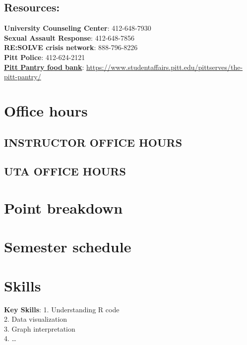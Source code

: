 \documentclass[
]{book}
\begin{document}
\hypertarget{resources}{%
\section{Resources:}\label{resources}}

\textbf{University Counseling Center}: 412-648-7930\\
\textbf{Sexual Assault Response}: 412-648-7856\\
\textbf{RE:SOLVE crisis network}: 888-796-8226\\
\textbf{Pitt Police}: 412-624-2121\\
\href{https://www.studentaffairs.pitt.edu/pittserves/the-pitt-pantry/}{\textbf{Pitt Pantry food bank}}: \url{https://www.studentaffairs.pitt.edu/pittserves/the-pitt-pantry/}

\hypertarget{office-hours}{%
\chapter{Office hours}\label{office-hours}}

\hypertarget{instructor-office-hours}{%
\section{INSTRUCTOR OFFICE HOURS}\label{instructor-office-hours}}

\hypertarget{uta-office-hours}{%
\section{UTA OFFICE HOURS}\label{uta-office-hours}}

\hypertarget{points}{%
\chapter{Point breakdown}\label{points}}

\hypertarget{semester-schedule}{%
\chapter{Semester schedule}\label{semester-schedule}}

\hypertarget{skills}{%
\chapter{Skills}\label{skills}}

\textbf{Key Skills}:
1. Understanding R code\\
2. Data visualization\\
3. Graph interpretation\\
4. \ldots{}
\end{document}

